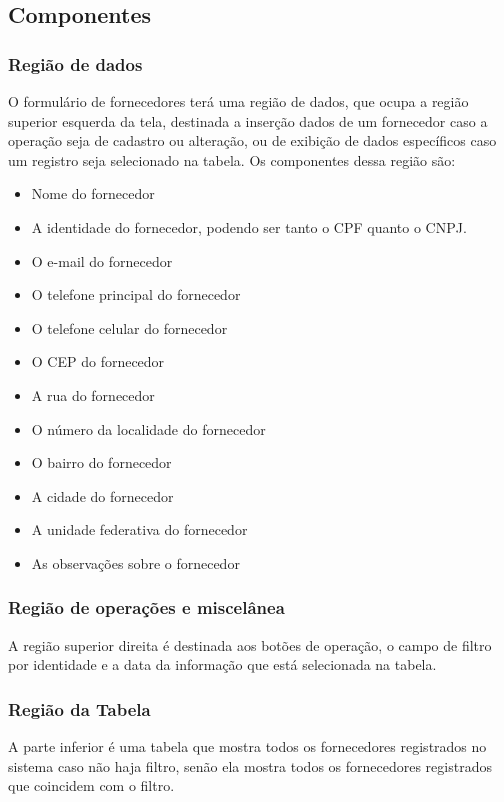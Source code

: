 \documentclass[
	article,			%
	12pt,				%
	oneside,			%
	a4paper,			%
	english,			%
	brazil,				%
	sumario=tradicional
	]{abntex2}
\begin{document}
		\subsection{Componentes}
			\subsubsection{Região de dados}
			O formulário de fornecedores terá uma região de dados, que ocupa a região superior esquerda da tela, destinada a inserção dados de um fornecedor caso a operação seja de cadastro ou alteração, ou de exibição de dados específicos caso um registro seja selecionado na tabela.
			Os componentes dessa região são:
			\begin{itemize}\itemsep1.5pt
				\item Nome do fornecedor
				\item A identidade do fornecedor, podendo ser tanto o CPF quanto o CNPJ.
				\item O e-mail do fornecedor
				\item O telefone principal do fornecedor
				\item O telefone celular do fornecedor
				\item O CEP do fornecedor
				\item A rua do fornecedor
				\item O número da localidade do fornecedor
				\item O bairro do fornecedor
				\item A cidade do fornecedor
				\item A unidade federativa do fornecedor
				\item As observações sobre o fornecedor
			\end{itemize}	
			\subsubsection{Região de operações e miscelânea}
			A região superior direita é destinada aos botões de operação, o campo de filtro por identidade e a data da informação que está selecionada na tabela.
			\subsubsection{Região da Tabela}
			A parte inferior é uma tabela que mostra todos os fornecedores registrados no sistema caso não haja filtro, senão ela mostra todos os fornecedores registrados que coincidem com o filtro.
	\newpage
\end{document}
